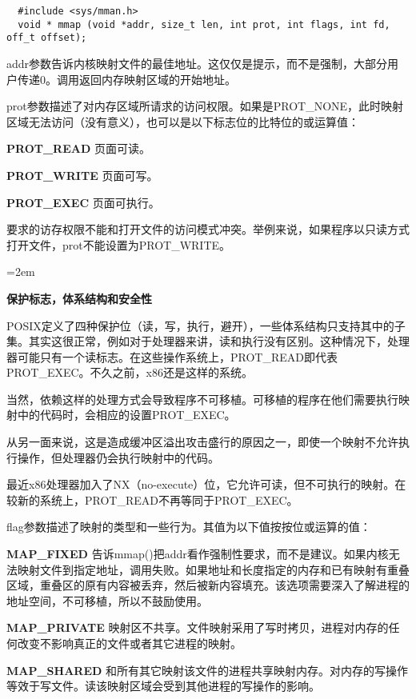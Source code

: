 \begin{lstlisting}
  #include <sys/mman.h>
  void * mmap (void *addr, size_t len, int prot, int flags, int fd, off_t offset);
\end{lstlisting}

addr参数告诉内核映射文件的最佳地址。这仅仅是提示，而不是强制，大部分用户传递0。调用返回内存映射区域的开始地址。

prot参数描述了对内存区域所请求的访问权限。如果是PROT\_NONE，此时映射区域无法访问（没有意义），也可以是以下标志位的比特位的或运算值：

\begin{eqlist*}
\item[\textbf{PROT\_READ}] 页面可读。
\item[\textbf{PROT\_WRITE}] 页面可写。
\item[\textbf{PROT\_EXEC}] 页面可执行。
\end{eqlist*}

要求的访存权限不能和打开文件的访问模式冲突。举例来说，如果程序以只读方式打开文件，prot不能设置为PROT\_WRITE。

\begin{center}
\begin{boxedminipage}{\textwidth}
\parindent=2em
\begin{center}\textbf{保护标志，体系结构和安全性}\end{center}

POSIX定义了四种保护位（读，写，执行，避开），一些体系结构只支持其中的子集。其实这很正常，例如对于处理器来讲，读和执行没有区别。这种情况下，处理器可能只有一个读标志。在这些操作系统上，PROT\_READ即代表PROT\_EXEC。不久之前，x86还是这样的系统。

当然，依赖这样的处理方式会导致程序不可移植。可移植的程序在他们需要执行映射中的代码时，会相应的设置PROT\_EXEC。

从另一面来说，这是造成缓冲区溢出攻击盛行的原因之一，即使一个映射不允许执行操作，但处理器仍会执行映射中的代码。

最近x86处理器加入了NX（no-execute）位，它允许可读，但不可执行的映射。在较新的系统上，PROT\_READ不再等同于PROT\_EXEC。
\end{boxedminipage}
\end{center}

flag参数描述了映射的类型和一些行为。其值为以下值按按位或运算的值：

\begin{eqlist*}
\item[\textbf{MAP\_FIXED}] 告诉mmap()把addr看作强制性要求，而不是建议。如果内核无法映射文件到指定地址，调用失败。如果地址和长度指定的内存和已有映射有重叠区域，重叠区的原有内容被丢弃，然后被新内容填充。该选项需要深入了解进程的地址空间，不可移植，所以不鼓励使用。
\item[\textbf{MAP\_PRIVATE}] 映射区不共享。文件映射采用了写时拷贝，进程对内存的任何改变不影响真正的文件或者其它进程的映射。
\item[\textbf{MAP\_SHARED}] 和所有其它映射该文件的进程共享映射内存。对内存的写操作等效于写文件。读该映射区域会受到其他进程的写操作的影响。
\end{eqlist*}

